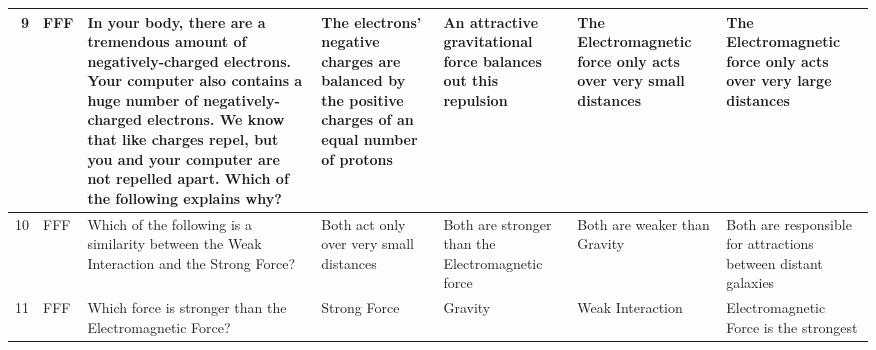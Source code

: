 \documentclass[10pt]{article}
\begin{document}
\begin{tiny}
\begin{longtable}{r|p{0.375in}|p{1.275in}|p{0.75in}|p{0.75in}|p{0.75in}|p{0.75in}}
    9     &     FFF &  In your body, there are a tremendous amount of negatively-charged electrons. Your computer also contains a huge number of negatively-charged electrons. We know that like charges repel, but you and your computer are not repelled apart. Which of the following explains why? &                                    The electrons' negative charges are balanced by the positive charges of an equal number of protons &                                         An attractive gravitational force balances out this repulsion &                                                              The Electromagnetic force only acts over very small distances &                                                                     The Electromagnetic force only acts over very large distances \\\hline
    10    &     FFF &                                                                                                                                                                                        Which of the following is a similarity between the Weak Interaction and the Strong Force? &                                                                                               Both act only over very small distances &                                                      Both are stronger than the Electromagnetic force &                                                                                               Both are weaker than Gravity &                                                                     Both are responsible for attractions between distant galaxies \\\hline
    11    &     FFF &                                                                                                                                                                                                                          Which force is stronger than the Electromagnetic Force? &                                                                                                                          Strong Force &                                                                                               Gravity &                                                                                                           Weak Interaction &                                                                                            Electromagnetic Force is the strongest \\\hline

\end{longtable}
\end{tiny}
\end{document}
